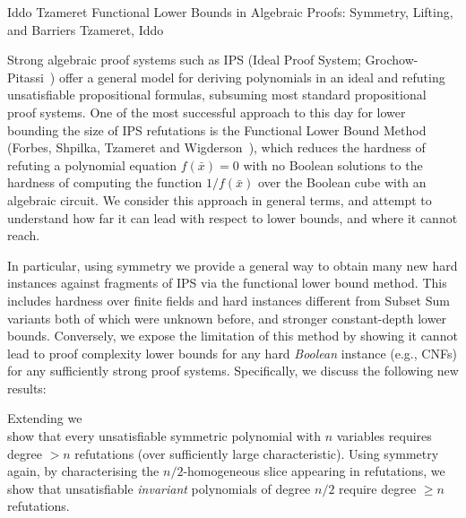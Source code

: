 \documentclass[report]{owrart}
\begin{document}
\begin{report}
    \begin{talk}{Iddo Tzameret}
        {Functional Lower Bounds in Algebraic Proofs: Symmetry, Lifting, and Barriers}
        {Tzameret, Iddo}
        
        \noindent
       
        


        Strong algebraic proof systems such as IPS (Ideal Proof System; 
Grochow-Pitassi~\cite{GP18}) offer a general model for 
deriving polynomials in an ideal and refuting unsatisfiable 
propositional formulas, subsuming most standard propositional 
proof systems. One of the most successful  approach to this day for lower bounding the size of 
IPS refutations is the Functional Lower Bound Method (Forbes, 
Shpilka, Tzameret and Wigderson~\cite{FSTW21}), which reduces 
the hardness of refuting a polynomial equation $f(\bar{x})=0$ with 
no Boolean solutions to the hardness of computing the function 
${1}/{f(\bar{x})}$ over the Boolean cube with an algebraic circuit. 
We consider this approach in general terms, and attempt to understand how far it can lead with respect to lower bounds, and where it cannot reach.

In particular, using symmetry we provide a general way to obtain many new hard instances against fragments of IPS via the functional lower bound method. This includes hardness over finite fields and  hard 
instances different from Subset Sum variants both of 
which were unknown before, and stronger constant-depth lower bounds.
Conversely, 
we expose the limitation of this method by showing it 
\mbox{cannot} lead to proof complexity lower bounds for any 
hard \textit{Boolean} instance (e.g., CNFs) for any
sufficiently strong proof systems. Specifically, we discuss the following new results: 

\begin{description}[align=left]
\item [\textbf{Nullstellensatz degree lower bounds using 
    symmetry}] Extending \cite{FSTW21} we \\ show  that every unsatisfiable symmetric polynomial with $n$ variables 
    requires degree $>n$ refutations
    (over sufficiently large characteristic).
    Using symmetry again, by characterising the
    ${n}/{2}$-homogeneous slice appearing in  refutations, we show that  
    unsatisfiable \emph{invariant} polynomials of degree ${n}/{2}$ require     degree $\ge n$ refutations.  


\end{description}
\end{talk}
\end{report}
\end{document}
